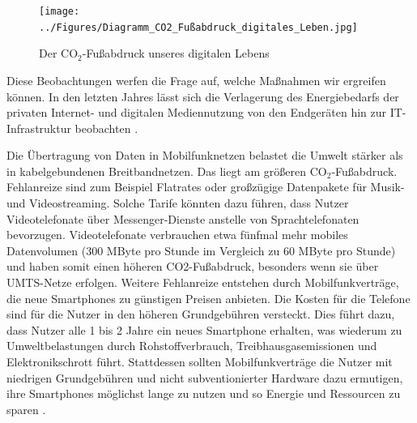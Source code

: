 \documentclass{article}
\begin{document}
\begin{figure}[h]
	\centering
		\texttt{[image: ../Figures/Diagramm\_CO2\_Fußabdruck\_digitales\_Leben.jpg]}	
	\caption{\label{fig:DiagrammCO2Fuss} Der CO$_2$-Fußabdruck unseres digitalen Lebens}
\end{figure}


Diese Beobachtungen werfen die Frage auf, welche Maßnahmen wir ergreifen können.
In den letzten Jahres lässt sich die Verlagerung
des Energiebedarfs der privaten Internet- und digitalen Mediennutzung
von den Endgeräten hin zur IT-Infrastruktur beobachten \cite{grunwald_energieverbrauch_2022}. 

Die Übertragung von Daten in Mobilfunknetzen belastet die Umwelt stärker als in kabelgebundenen Breitbandnetzen. Das liegt am größeren CO$_2$-Fußabdruck. 
Fehlanreize sind zum Beispiel Flatrates oder großzügige Datenpakete für Musik- und Videostreaming. Solche Tarife könnten dazu führen, dass Nutzer Videotelefonate über Messenger-Dienste anstelle von Sprachtelefonaten bevorzugen. Videotelefonate verbrauchen etwa fünfmal mehr mobiles Datenvolumen (300 MByte pro Stunde im Vergleich zu 60 MByte pro Stunde) und haben somit einen höheren CO2-Fußabdruck, besonders wenn sie über UMTS-Netze erfolgen.
Weitere Fehlanreize entstehen durch Mobilfunkverträge, die neue Smartphones zu günstigen Preisen anbieten. Die Kosten für die Telefone sind für die Nutzer in den höheren Grundgebühren versteckt. Dies führt dazu, dass Nutzer alle 1 bis 2 Jahre ein neues Smartphone erhalten, was wiederum zu Umweltbelastungen durch Rohstoffverbrauch, Treibhausgasemissionen und Elektronikschrott führt. Stattdessen sollten Mobilfunkverträge die Nutzer mit niedrigen Grundgebühren und nicht subventionierter Hardware dazu ermutigen, ihre Smartphones möglichst lange zu nutzen und so Energie und Ressourcen zu sparen \cite{energieeffizienz_IT_2020}.
\end{document}
